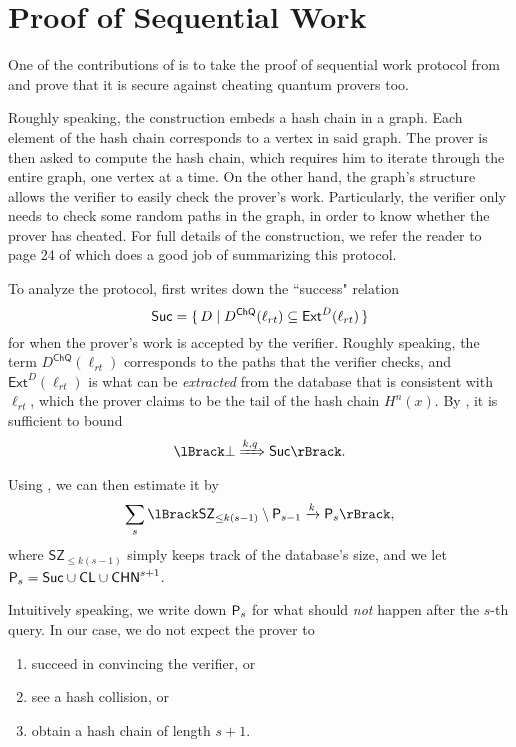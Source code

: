 \section{Proof of Sequential Work}

One of the contributions of \cite{main-result} is to take the proof of sequential work protocol from \cite{posw} and prove that it is secure against cheating quantum provers too.

Roughly speaking, the construction embeds a hash chain in a graph.
Each element of the hash chain corresponds to a vertex in said graph.
The prover is then asked to compute the hash chain,
which requires him to iterate through the entire graph, one vertex at a time.
On the other hand, the graph's structure allows the verifier to easily check the prover's work.
Particularly, the verifier only needs to check some random paths in the graph, in order to know whether the prover has cheated.
For full details of the construction, we refer the reader to page 24 of \cite{main-result} which does a good job of summarizing this protocol.

To analyze the protocol, \cite{main-result} first writes down the ``success" relation
$$\mathsf{Suc}=\set{D|D^{\mathsf{ChQ}}(\ell_{rt})\subseteq \mathsf{Ext}^D(\ell_{rt})}$$
for when the prover's work is accepted by the verifier.
Roughly speaking, the term $D^{\mathsf{ChQ}}(\ell_{rt})$ corresponds to the paths that the verifier checks,
and $\mathsf{Ext}^D(\ell_{rt})$ is what can be \emph{extracted} from the database that is consistent with $\ell_{rt}$,
which the prover claims to be the tail of the hash chain $H^n(x)$.
By , it is sufficient to bound
$$\lBrack\bot\xRightarrow{k, q}\mathsf{Suc}\rBrack.$$
Using ,
we can then estimate it by
\begin{equation}
	\label{eq:posw-multi-to-single}
	\sum_{s}\lBrack\mathsf{SZ}_{\leq k(s-1)}\setminus\sfP_{s-1}\xrightarrow{k}\sfP_s\rBrack,
\end{equation}
where $\mathsf{SZ}_{\leq k(s-1)}$ simply keeps track of the database's size,
and we let $\mathsf{P}_s=\mathsf{Suc}\cup\mathsf{CL}\cup\mathsf{CHN}^{s+1}$.

Intuitively speaking, we write down $\mathsf{P}_s$ for what should \emph{not} happen after the $s$-th query.
In our case, we do not expect the prover to
\begin{enumerate}
	\item succeed in convincing the verifier, or
	\item see a hash collision, or
	\item obtain a hash chain of length $s+1$.
\end{enumerate}


